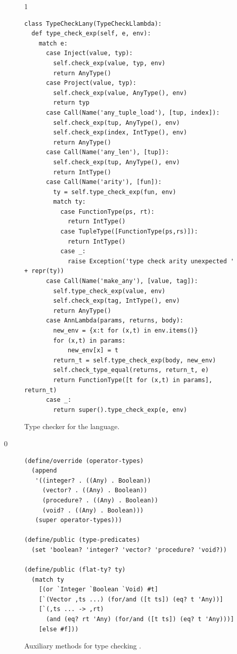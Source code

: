\documentclass[7x10]{TimesAPriori_MIT}%
\def\racketEd{0}
\def\pythonEd{1}
\providecommand{\BookEdition}{1}
\let\edition\BookEdition
\newcommand{\pythonColor}[0]{}
\numberwithin{theorem}{chapter}
\numberwithin{definition}{chapter}
\numberwithin{equation}{chapter}
\begin{document}
\begin{figure}[btp]
\begin{tcolorbox}[colback=white]
{\fi}
{\if\edition\pythonEd\pythonColor
\begin{lstlisting}
class TypeCheckLany(TypeCheckLlambda):
  def type_check_exp(self, e, env):
    match e:
      case Inject(value, typ):
        self.check_exp(value, typ, env)
        return AnyType()
      case Project(value, typ):
        self.check_exp(value, AnyType(), env)
        return typ
      case Call(Name('any_tuple_load'), [tup, index]):
        self.check_exp(tup, AnyType(), env)
        self.check_exp(index, IntType(), env)
        return AnyType()
      case Call(Name('any_len'), [tup]):
        self.check_exp(tup, AnyType(), env)
        return IntType()
      case Call(Name('arity'), [fun]):
        ty = self.type_check_exp(fun, env)
        match ty:
          case FunctionType(ps, rt):
            return IntType()
          case TupleType([FunctionType(ps,rs)]):
            return IntType()
          case _:
            raise Exception('type check arity unexpected ' + repr(ty))
      case Call(Name('make_any'), [value, tag]):
        self.type_check_exp(value, env)
        self.check_exp(tag, IntType(), env)
        return AnyType()
      case AnnLambda(params, returns, body):
        new_env = {x:t for (x,t) in env.items()}
        for (x,t) in params:
            new_env[x] = t
        return_t = self.type_check_exp(body, new_env)
        self.check_type_equal(returns, return_t, e)
        return FunctionType([t for (x,t) in params], return_t)
      case _:
        return super().type_check_exp(e, env)
\end{lstlisting}
\fi}
  \end{tcolorbox}

  \caption{Type checker for the \LangAny{} language.}
\label{fig:type-check-Lany}
\end{figure}

{\if\edition\racketEd
\begin{figure}[tbp]
  \begin{tcolorbox}[colback=white]
\begin{lstlisting}
(define/override (operator-types)
  (append
   '((integer? . ((Any) . Boolean))
     (vector? . ((Any) . Boolean))
     (procedure? . ((Any) . Boolean))
     (void? . ((Any) . Boolean)))
   (super operator-types)))

(define/public (type-predicates)
  (set 'boolean? 'integer? 'vector? 'procedure? 'void?))

(define/public (flat-ty? ty)
  (match ty
    [(or `Integer `Boolean `Void) #t]
    [`(Vector ,ts ...) (for/and ([t ts]) (eq? t 'Any))]
    [`(,ts ... -> ,rt)
      (and (eq? rt 'Any) (for/and ([t ts]) (eq? t 'Any)))]
    [else #f]))
\end{lstlisting}
\end{tcolorbox}

\caption{Auxiliary methods for type checking \LangAny{}.}
\label{fig:type-check-Lany-aux}
\end{figure}
\fi}
\end{document}
